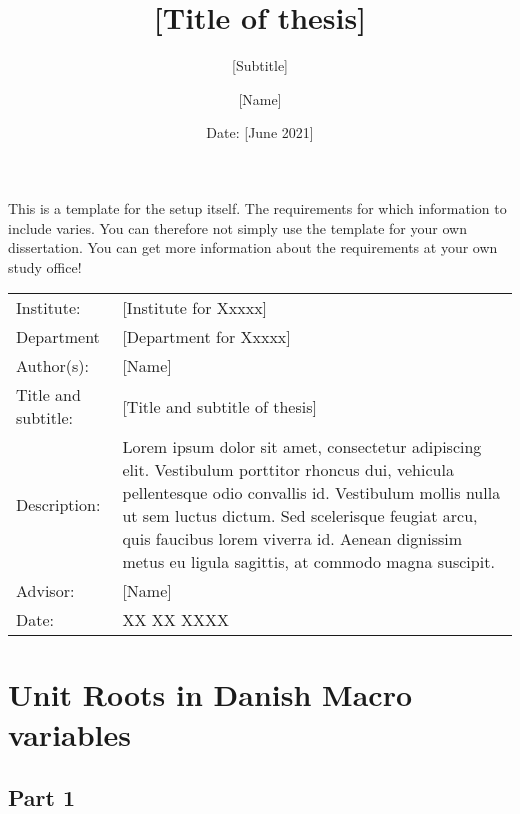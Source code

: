 \documentclass[12pt]{article}
\author{[Name]}
\title{[Title of thesis]}
\subtitle{[Subtitle]}
\date{Date: {[June 2021]}}
\begin{document}
\maketitle

\onehalfspacing

\noindent This is a template for the setup itself. The requirements for which information to include varies. You can therefore not simply use the template for your own dissertation. You can get more information about the requirements at your own study office!
\begin{table}[h]
\def\arraystretch{1.5}
\begin{tabularx}{\textwidth}{l X}
Institute: & {[Institute for Xxxxx]}  \\
Department & {[Department for Xxxxx]} \\
Author(s): & {[Name]} \\
Title and subtitle: & {[Title and subtitle of thesis]} \\
Description: & Lorem ipsum dolor sit amet, consectetur adipiscing elit. Vestibulum porttitor rhoncus dui, vehicula pellentesque odio convallis id. Vestibulum mollis nulla ut sem luctus dictum. Sed scelerisque feugiat arcu, quis faucibus lorem viverra id. Aenean dignissim metus eu ligula sagittis, at commodo magna suscipit. \\
Advisor: & {[Name]} \\
Date: & XX XX XXXX
\end{tabularx}
\end{table}
\newpage

\tableofcontents
\newpage

{\selectfont


\section{Unit Roots in Danish Macro variables}



\subsection{Part 1}







}
\end{document}
